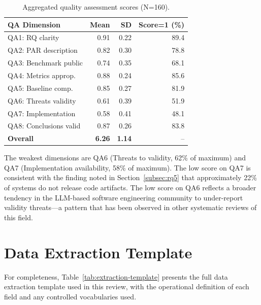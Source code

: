 \begin{table}[h]
\caption{Aggregated quality assessment scores (N=160).}
\label{tab:qa-scores}
\small
\begin{tabular}{lrrr}
\toprule
\textbf{QA Dimension} & \textbf{Mean} & \textbf{SD} & \textbf{Score=1 (\%)} \\
\midrule
QA1: RQ clarity         & 0.91 & 0.22 & 89.4 \\
QA2: PAR description    & 0.82 & 0.30 & 78.8 \\
QA3: Benchmark public   & 0.74 & 0.35 & 68.1 \\
QA4: Metrics approp.    & 0.88 & 0.24 & 85.6 \\
QA5: Baseline comp.     & 0.85 & 0.27 & 81.9 \\
QA6: Threats validity   & 0.61 & 0.39 & 51.9 \\
QA7: Implementation     & 0.58 & 0.41 & 48.1 \\
QA8: Conclusions valid  & 0.87 & 0.26 & 83.8 \\
\midrule
\textbf{Overall}        & \textbf{6.26} & \textbf{1.14} & -- \\
\bottomrule
\end{tabular}
\end{table}

The weakest dimensions are QA6 (Threats to validity, 62\% of maximum) and QA7 (Implementation
availability, 58\% of maximum). The low score on QA7 is consistent with the finding noted in
Section~\ref{subsec:rq5} that approximately 22\% of systems do not release code artifacts.
The low score on QA6 reflects a broader tendency in the LLM-based software engineering
community to under-report validity threats---a pattern that has been observed in other
systematic reviews of this field.

\section{Data Extraction Template}
\label{appendix:extraction}

For completeness, Table~\ref{tab:extraction-template} presents the full data extraction
template used in this review, with the operational definition of each field and any controlled
vocabularies used.


